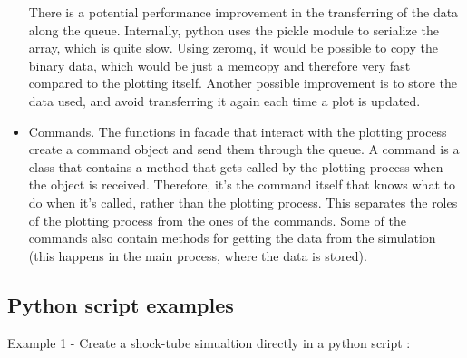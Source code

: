 \documentclass[a4paper]{article}
\begin{document}
\begin{itemize}
There is a potential performance improvement in the transferring of the data along the queue. Internally, python uses the pickle module to serialize the array, which is quite slow. Using zeromq, it would be possible to copy the binary data, which would be just a memcopy and therefore very fast compared to the plotting itself. Another possible improvement is to store the data used, and avoid transferring it again each time a plot is updated.

\item Commands. The functions in facade that interact with the plotting process create a command object and send them through the queue. A command is a class that contains a method that gets called by the plotting process when the object is received. Therefore, it's the command itself that knows what to do when it's called, rather than the plotting process. This separates the roles of the plotting process from the ones of the commands. Some of the commands also contain methods for getting the data from the simulation (this happens in the main process, where the data is stored).


\end{itemize}

\newpage 
\subsection{Python script examples}

\noindent Example 1 - Create a shock-tube simualtion directly in a python script : \\
\end{document}
